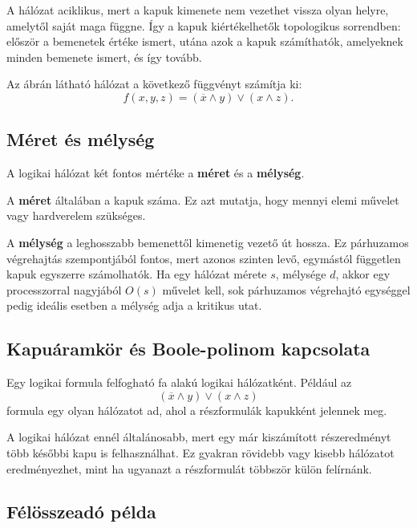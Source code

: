 A hálózat aciklikus, mert a kapuk kimenete nem vezethet vissza olyan helyre, amelytől saját maga függne. Így a kapuk kiértékelhetők topologikus sorrendben: először a bemenetek értéke ismert, utána azok a kapuk számíthatók, amelyeknek minden bemenete ismert, és így tovább.



Az ábrán látható hálózat a következő függvényt számítja ki:
\[
  f(x,y,z)=(\overline{x}\wedge y)\vee(x\wedge z).
\]

\subsection{Méret és mélység}

A logikai hálózat két fontos mértéke a \textbf{méret} és a \textbf{mélység}.

\begin{center}

\end{center}

A \textbf{méret} általában a kapuk száma. Ez azt mutatja, hogy mennyi elemi művelet vagy hardverelem szükséges.

A \textbf{mélység} a leghosszabb bemenettől kimenetig vezető út hossza. Ez párhuzamos végrehajtás szempontjából fontos, mert azonos szinten levő, egymástól független kapuk egyszerre számolhatók. Ha egy hálózat mérete $s$, mélysége $d$, akkor egy processzorral nagyjából $O(s)$ művelet kell, sok párhuzamos végrehajtó egységgel pedig ideális esetben a mélység adja a kritikus utat.

\subsection{Kapuáramkör és Boole-polinom kapcsolata}

Egy logikai formula felfogható fa alakú logikai hálózatként. Például az
\[
  (\overline{x}\wedge y)\vee(x\wedge z)
\]
formula egy olyan hálózatot ad, ahol a részformulák kapukként jelennek meg.

A logikai hálózat ennél általánosabb, mert egy már kiszámított részeredményt több későbbi kapu is felhasználhat. Ez gyakran rövidebb vagy kisebb hálózatot eredményezhet, mint ha ugyanazt a részformulát többször külön felírnánk.

\subsection{Félösszeadó példa}

